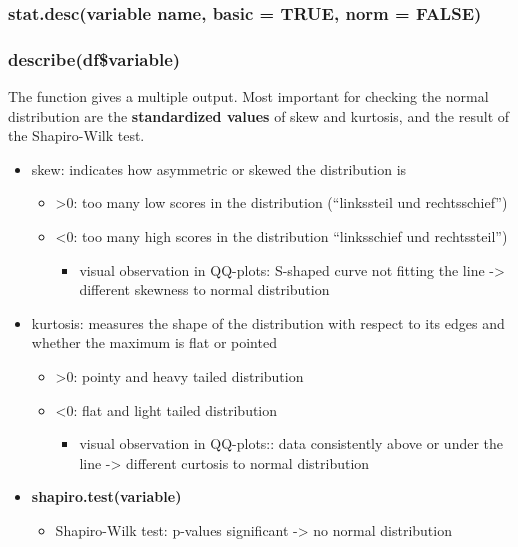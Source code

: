 \documentclass[
]{article}
\providecommand{\tightlist}{%
  \setlength{\itemsep}{0pt}\setlength{\parskip}{0pt}}
\begin{document}
\hypertarget{stat.descvariable-name-basic-true-norm-false}{%
\subsubsection{stat.desc(variable name, basic = TRUE, norm =
FALSE)}\label{stat.descvariable-name-basic-true-norm-false}}

\hypertarget{describedfvariable}{%
\subsubsection{describe(df\$variable)}\label{describedfvariable}}

The function gives a multiple output. Most important for checking the
normal distribution are the \textbf{standardized values} of skew and
kurtosis, and the result of the Shapiro-Wilk test.

\begin{itemize}
\item
  skew: indicates how asymmetric or skewed the distribution is

  \begin{itemize}
  \item
    \textgreater0: too many low scores in the distribution (``linkssteil
    und rechtsschief'')
  \item
    \textless0: too many high scores in the distribution ``linksschief
    und rechtssteil'')

    \begin{itemize}
    \tightlist
    \item
      visual observation in QQ-plots: S-shaped curve not fitting the
      line -\textgreater{} different skewness to normal distribution
    \end{itemize}
  \end{itemize}
\item
  kurtosis: measures the shape of the distribution with respect to its
  edges and whether the maximum is flat or pointed

  \begin{itemize}
  \item
    \textgreater0: pointy and heavy tailed distribution
  \item
    \textless0: flat and light tailed distribution

    \begin{itemize}
    \tightlist
    \item
      visual observation in QQ-plots:: data consistently above or under
      the line -\textgreater{} different curtosis to normal distribution
    \end{itemize}
  \end{itemize}
\item
  \textbf{shapiro.test(variable)}

  \begin{itemize}
  \tightlist
  \item
    Shapiro-Wilk test: p-values significant -\textgreater{} no normal
    distribution
  \end{itemize}
\end{itemize}
\end{document}
